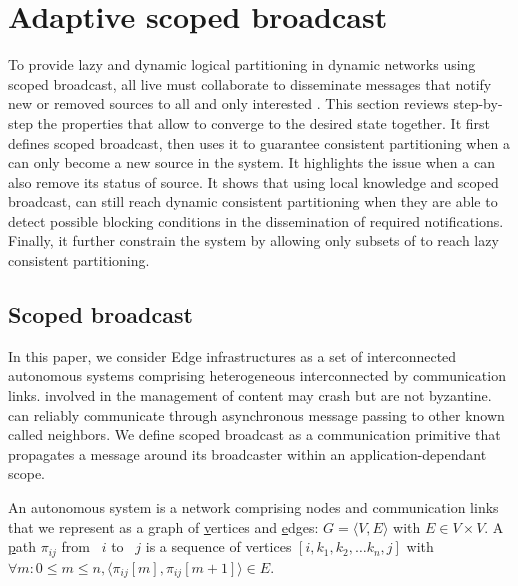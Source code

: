 
\section{Adaptive scoped broadcast}
\label{sec:adaptive}

To provide lazy and dynamic logical partitioning in dynamic networks
using scoped broadcast, all live \processes must collaborate to
disseminate messages that notify new or removed sources to all and
only interested \processes. This section reviews step-by-step the
properties that allow \processes to converge to the desired state
together. It first defines scoped broadcast, then uses it to guarantee
consistent partitioning when a \process can only become a new source
in the system. It highlights the issue when a \process can also remove
its status of source. It shows that using local knowledge and scoped
broadcast, \processes can still reach dynamic consistent partitioning
when they are able to detect possible blocking conditions in the
dissemination of required notifications. Finally, it further constrain
the system by allowing only subsets of \processes to reach lazy
consistent partitioning. 


\subsection{Scoped broadcast}
\label{subsec:scoped}

In this paper, we consider Edge infrastructures as a set of
interconnected autonomous systems comprising heterogeneous \nodes
interconnected by communication links. \Processes involved in the
management of content may crash but are not byzantine.  \Processes can
reliably communicate through asynchronous message passing to other
known \processes called neighbors.  We define scoped broadcast as a
communication primitive that propagates a message around its
broadcaster within an application-dependant scope.

\begin{definition}
  An autonomous system is a network comprising nodes and communication
  links that we represent as a \underline{g}raph of
  \underline{v}ertices and \underline{e}dges: $G = \langle V, E
  \rangle$ with $E \in V \times V$. A \underline{p}ath $\pi_{ij}$ from
  \Process~$i$ to \Process~$j$ is a sequence of vertices $[i, k_1,
    k_2, \ldots k_n, j]$ with $\forall m: 0\leq m \leq n, \langle
  \pi_{ij}[m], \pi_{ij}[m+1] \rangle \in E$.
\end{definition}

